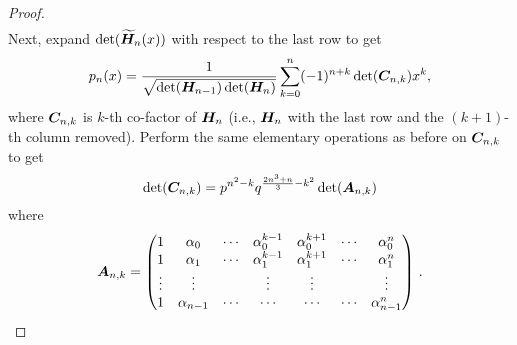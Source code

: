 \begin{subappendices}
\begin{proof}
\begin{align}
\end{align}
Next, expand $\det(\widetilde{\bm{H}}_n(x))$ with respect to the last row to get
\begin{equation}\label{eq:PolynomialExpression1}
p_{n}(x)=\frac{1}{\sqrt{\det(\bm{H}_{n-1})\det(\bm{H}_n)}}\sum_{k=0}^{n}(-1)^{n+k} \det(\bm{C}_{n,k}) x^{k},
\end{equation}
where $\bm{C}_{n,k}$ is $k$-th co-factor of $\bm{H}_n$ (i.e., $\bm{H}_n$ with the last row and the $(k+1)$-th column removed). Perform the same elementary operations as before on $\bm{C}_{n,k}$ to get
\begin{equation} \label{cofactor_det}
\det(\bm{C}_{n,k})=p^{n^{2}-k}q^{\frac{2n^{3}+n}{3}-k^{2}} \det( \bm{A}_{n,k} )
\end{equation}
where
\[ \bm{A}_{n,k} = \begin{pmatrix}
1&\alpha_{0}&\cdots&\alpha_{0}^{k-1}&\alpha_{0}^{k+1}&\cdots&\alpha_{0}^{n} \\
1&\alpha_{1}&\cdots&\alpha_{1}^{k-1}&\alpha_{1}^{k+1}&\cdots&\alpha_{1}^{n}  \\
\vdots&\vdots& &\vdots&\vdots&&\vdots\\
1&\alpha_{n-1}&\cdots&\cdots&\cdots&\cdots&\alpha_{n-1}^{n}
\end{pmatrix}  \,. \]


\end{proof}
\end{subappendices}
